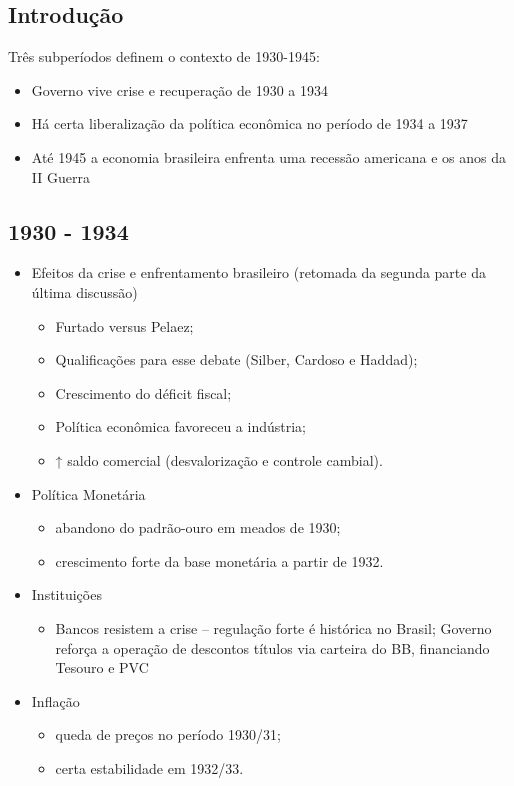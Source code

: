 \documentclass[a4paper,12pt]{article}[abntex2]
\begin{document}
\subsection{\textbf{Introdução}}
Três subperíodos definem o contexto de 1930-1945:
    \begin{itemize}
        \item Governo vive crise e recuperação de 1930 a 1934
        \item Há certa liberalização da política econômica no período de 1934 a 1937
        \item Até 1945 a economia brasileira enfrenta uma recessão americana e os anos da II Guerra
    \end{itemize}

\subsection{\textbf{1930 - 1934}}
\begin{itemize}
    \item Efeitos da crise e enfrentamento brasileiro (retomada da segunda parte da última discussão)
    \begin{itemize}
        \item Furtado versus Pelaez;
        \item Qualificações para esse debate (Silber, Cardoso e Haddad);
        \item Crescimento do déficit fiscal;
        \item Política econômica favoreceu a indústria;
        \item ↑ saldo comercial (desvalorização e controle cambial).
    \end{itemize}
\end{itemize}

\begin{itemize}
    \item Política Monetária
    \begin{itemize}
        \item abandono do padrão-ouro em meados de 1930;
        \item crescimento forte da base monetária a partir de 1932.
    \end{itemize}
    \item Instituições
    \begin{itemize}
        \item Bancos resistem a crise – regulação forte é histórica no Brasil;
Governo reforça a operação de descontos títulos via carteira do BB, financiando Tesouro e PVC
    \end{itemize}
    \item Inflação
    \begin{itemize}
        \item queda de preços no período 1930/31;
        \item certa estabilidade em 1932/33.
    \end{itemize}
\end{itemize}
\end{document}
